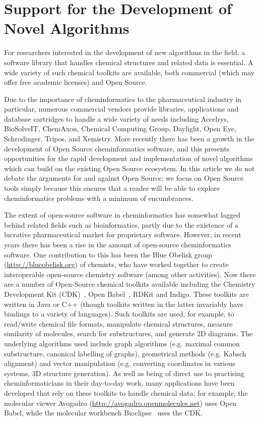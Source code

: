 \documentclass{sig-alternate}
\begin{document}
\section{Support for the Development of Novel Algorithms}
\label{sec:development-support}

For researchers interested in the development of new algorithms in the
field, a software library that handles chemical structures and related
data is essential. A wide variety of such chemical toolkits are
available, both commercial (which may offer free academic
licenses) and Open Source. 

Due to the importance of cheminformatics to the pharmaceutical
industry in particular, numerous commercial vendors provide libraries,
applications and database cartridges to handle a wide variety of
needs including Accelrys, BioSolveIT, ChemAxon, Chemical Computing Group,
Daylight, Open Eye, Schrodinger, Tripos, and Xemistry. More recently
there has been a growth in the development of Open
Source cheminformatics software, and this presents opportunities for
the rapid development and implementation of novel algorithms which can
build on the existing Open Source ecosystem. In this article we do not debate the
arguments for and against Open Source; we focus on Open Source
tools simply because this ensures that a reader will be able to explore
cheminformatics problems with a minimum of encumbrances.

The extent of open-source software in cheminformatics has somewhat
lagged behind related fields such as bioinformatics, partly
due to the existence of a lucrative pharmaceutical market for
proprietary software. However, in recent years there has been a
rise in the amount of open-source cheminformatics software. One
contribution to this has been the Blue Obelisk
group~\cite{BlueObelisk2011}
(\url{http://blueobelisk.org}) of chemists, who have worked together to
create interoperable open-source chemistry software (among other
activities). Now there are a number of Open-Source chemical toolkits available
including the Chemistry Development
Kit (CDK)~\cite{steinbeck2003}, Open Babel~\cite{openbabel2011}, RDKit and Indigo. These toolkits are written in
Java or C++ (though toolkits written in the latter invariably have
bindings to a variety of languages). Such toolkits are used, for
example, to read/write chemical file formats, manipulate chemical
structures, measure similarity of molecules, search for substructures,
and generate 2D diagrams. The underlying algorithms used include graph
algorithms (e.g. maximal common substructure, canonical labelling of
graphs), geometrical methods (e.g. Kabsch alignment) and vector
manipulation (e.g. converting coordinates in various systems, 3D
structure generation). As well as being of direct use to practising
cheminformaticians in their day-to-day work, many applications have
been developed that rely on these toolkits to handle chemical data;
for example, the molecular viewer Avogadro
(\url{http://avogadro.openmolecules.net}) uses Open Babel, while the
molecular workbench Bioclipse~\cite{Bioclipse2} uses the CDK.
\end{document}
